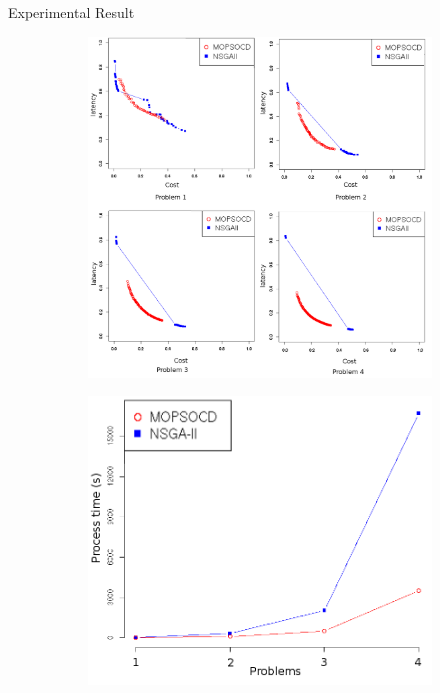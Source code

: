 \documentclass[10pt]{beamer}
\begin{document}
\begin{frame}{Experimental Result}{}
\begin{figure}[htb]
	\centering
	\begin{subfigure}[b]{0.6\textwidth}
	\includegraphics[width=\linewidth]{./Feathergraphics/summary.png}
	\end{subfigure}
	\begin{subfigure}[b]{0.39\textwidth}
		\includegraphics[width=\linewidth]{./Feathergraphics/state3.png}
	\end{subfigure}
\end{figure}
\end{frame}
\end{document}
